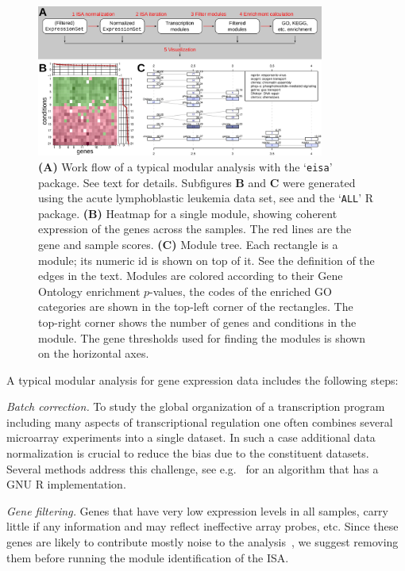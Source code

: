 \documentclass{bioinfo}
\newcommand{\Rpackage}[1]{`\texttt{#1}'}
\newcommand{\subfig}[1]{\textbf{#1}}
\begin{document}
\begin{figure}
\centering
\includegraphics[width=0.842\textwidth]{isa2workflow3}
\caption{\subfig{(A)} Work flow of a typical modular analysis with the
  \Rpackage{eisa} package. See text for details.
  Subfigures \subfig{B} and \subfig{C} were generated
  using the acute lymphoblastic leukemia data set, see
  \citep{chiaretti04} and the \Rpackage{ALL} R package.
  \subfig{(B)} Heatmap for a single module, showing coherent
  expression of the genes across the samples. The red lines are the gene and
  sample scores.
  \subfig{(C)} Module tree. Each rectangle is a module; its numeric id
  is shown on top of it. See the definition of the edges in the
  text. Modules are colored 
  according to their Gene Ontology enrichment $p$-values, the codes of
  the enriched GO categories are shown in the top-left corner of the
  rectangles. The top-right corner shows the number of genes and
  conditions in the module. The gene thresholds used for finding
  the modules is shown on the horizontal axes.
}
\label{fig:workflow}
\end{figure}

A typical modular analysis for gene expression data includes the following
steps:

\emph{Batch correction.}
To study the global organization of a transcription program including
many aspects of transcriptional regulation one often combines several
microarray experiments into a single dataset. In such a case
additional data normalization is crucial to reduce the bias due to
the constituent datasets. Several methods address this challenge,
see e.g.~\citep{johnson07} for an algorithm that has a GNU R
implementation.

\emph{Gene filtering.}
Genes that have very low expression levels in all samples, carry little if
any information and may reflect ineffective array probes, etc. Since these
genes are likely to contribute mostly noise to the
analysis~\citep{hackstadt09}, we suggest removing them before running
the module identification of the ISA.
\end{document}
